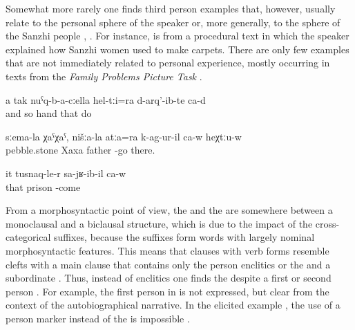 Somewhat more rarely one finds third person examples that, however, usually relate to the personal sphere of the speaker or, more generally, to the sphere of the Sanzhi people , . For instance,  is from a procedural text in which the speaker explained how Sanzhi women used to make carpets. There are only few examples that are not immediately related to personal experience, mostly occurring in texts from the \textit{Family Problems Picture Task} \citep{SanRoqueEtAl2012} .

\begin{exe}
	\ex	\label{ex:And like this with the hands (they) also made them analytic}
	\gll	a	tak	nuˁq-b-a-cːella	hel-tːi=ra	d-arq'-ib-te	ca-d\\
		and	so	hand	that	do 	\\
	\glt	{}

	\ex	\label{ex:‎Semalla Xaxa (place name). Our father also fell down there}
	\gll	sːema-la	χaˁχaˁ,	nišːa-la	atːa=ra	k-ag-ur-il ca-w	heχtːu-w\\
		pebble.stone	Xaxa		father	-go		there.\\
	\glt	{}

	\ex	\label{ex:‎He came back from prison analytic}
	\gll	it	tusnaq-le-r	sa-jʁ-ib-il	ca-w\\
		that	prison	-come \\
	\glt	{}
\end{exe}


From a morphosyntactic point of view, the  and the  are somewhere between a monoclausal and a biclausal structure, which is due to the impact of the cross-categorical suffixes, because the suffixes form words with largely nominal morphosyntactic features. This means that clauses with  verb forms resemble clefts with a main  clause that contains only the person enclitics or the  and a subordinate . Thus, instead of  enclitics one finds the  despite a first or second person . For example, the first person  in  is not expressed, but clear from the context of the autobiographical narrative. In the elicited example , the use of a person marker instead of the  is impossible .

